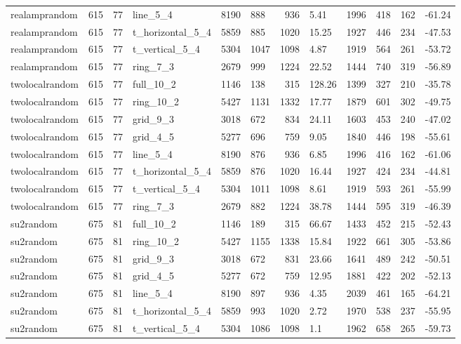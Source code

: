 \begin{longtable}{lrrlllrlllrl}
realamprandom & 615 & 77 & line\_5\_4 & 8190 & 888 & 936 & 5.41 & 1996 & 418 & 162 & -61.24 \\
realamprandom & 615 & 77 & t\_horizontal\_5\_4 & 5859 & 885 & 1020 & 15.25 & 1927 & 446 & 234 & -47.53 \\
realamprandom & 615 & 77 & t\_vertical\_5\_4 & 5304 & 1047 & 1098 & 4.87 & 1919 & 564 & 261 & -53.72 \\
realamprandom & 615 & 77 & ring\_7\_3 & 2679 & 999 & 1224 & 22.52 & 1444 & 740 & 319 & -56.89 \\
twolocalrandom & 615 & 77 & full\_10\_2 & 1146 & 138 & 315 & 128.26 & 1399 & 327 & 210 & -35.78 \\
twolocalrandom & 615 & 77 & ring\_10\_2 & 5427 & 1131 & 1332 & 17.77 & 1879 & 601 & 302 & -49.75 \\
twolocalrandom & 615 & 77 & grid\_9\_3 & 3018 & 672 & 834 & 24.11 & 1603 & 453 & 240 & -47.02 \\
twolocalrandom & 615 & 77 & grid\_4\_5 & 5277 & 696 & 759 & 9.05 & 1840 & 446 & 198 & -55.61 \\
twolocalrandom & 615 & 77 & line\_5\_4 & 8190 & 876 & 936 & 6.85 & 1996 & 416 & 162 & -61.06 \\
twolocalrandom & 615 & 77 & t\_horizontal\_5\_4 & 5859 & 876 & 1020 & 16.44 & 1927 & 424 & 234 & -44.81 \\
twolocalrandom & 615 & 77 & t\_vertical\_5\_4 & 5304 & 1011 & 1098 & 8.61 & 1919 & 593 & 261 & -55.99 \\
twolocalrandom & 615 & 77 & ring\_7\_3 & 2679 & 882 & 1224 & 38.78 & 1444 & 595 & 319 & -46.39 \\
su2random & 675 & 81 & full\_10\_2 & 1146 & 189 & 315 & 66.67 & 1433 & 452 & 215 & -52.43 \\
su2random & 675 & 81 & ring\_10\_2 & 5427 & 1155 & 1338 & 15.84 & 1922 & 661 & 305 & -53.86 \\
su2random & 675 & 81 & grid\_9\_3 & 3018 & 672 & 831 & 23.66 & 1641 & 489 & 242 & -50.51 \\
su2random & 675 & 81 & grid\_4\_5 & 5277 & 672 & 759 & 12.95 & 1881 & 422 & 202 & -52.13 \\
su2random & 675 & 81 & line\_5\_4 & 8190 & 897 & 936 & 4.35 & 2039 & 461 & 165 & -64.21 \\
su2random & 675 & 81 & t\_horizontal\_5\_4 & 5859 & 993 & 1020 & 2.72 & 1970 & 538 & 237 & -55.95 \\
su2random & 675 & 81 & t\_vertical\_5\_4 & 5304 & 1086 & 1098 & 1.1 & 1962 & 658 & 265 & -59.73 \\

\end{longtable}
